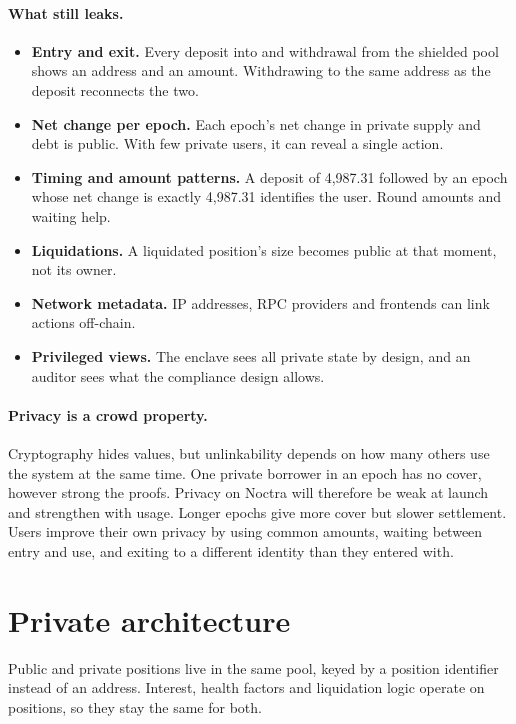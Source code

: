 \documentclass[11pt,a4paper]{article}
\begin{document}
\paragraph{What still leaks.}
\begin{itemize}
  \item \textbf{Entry and exit.} Every deposit into and withdrawal from the shielded pool shows an address and an
        amount. Withdrawing to the same address as the deposit reconnects the two.
  \item \textbf{Net change per epoch.} Each epoch's net change in private supply and debt is public. With few
        private users, it can reveal a single action.
  \item \textbf{Timing and amount patterns.} A deposit of 4,987.31 followed by an epoch whose net change is
        exactly 4,987.31 identifies the user. Round amounts and waiting help.
  \item \textbf{Liquidations.} A liquidated position's size becomes public at that moment, not its owner.
  \item \textbf{Network metadata.} IP addresses, RPC providers and frontends can link actions off-chain.
  \item \textbf{Privileged views.} The enclave sees all private state by design, and an auditor sees what the
        compliance design allows.
\end{itemize}

\paragraph{Privacy is a crowd property.} Cryptography hides values, but unlinkability depends on how many others use the system at the same time. One
private borrower in an epoch has no cover, however strong the proofs. Privacy on Noctra will therefore be weak at
launch and strengthen with usage. Longer epochs give more cover but slower settlement. Users improve their own
privacy by using common amounts, waiting between entry and use, and exiting to a different identity than they
entered with.

\section{Private architecture}

Public and private positions live in the same pool, keyed by a position identifier instead of an address.
Interest, health factors and liquidation logic operate on positions, so they stay the same for both.
\end{document}
